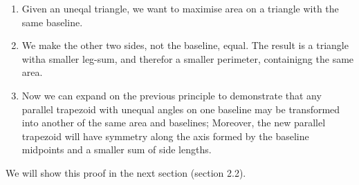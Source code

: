 \documentclass[a4paper]{book}
\numberwithin{theorem}{section}%
\begin{document}
\begin{enumerate}
    \item Given an uneqal triangle, we want to maximise area on a triangle with the same baseline. 

    \item We make the other two sides, not the baseline, equal. The result is a triangle witha smaller leg-sum, and therefor a smaller perimeter, containigng the same area.

    \item Now we can expand on the previous principle to demonstrate that any parallel trapezoid with unequal angles on one baseline may be transformed into another of the same area and baselines; Moreover, the new parallel trapezoid will have symmetry along the axis formed by the baseline midpoints and a smaller sum of side lengths. 
\end{enumerate}

We will show this proof in the next section (section 2.2).
\newline
\newline
\end{document}

